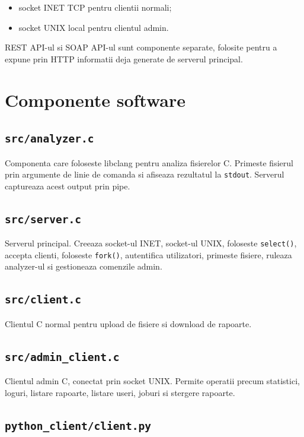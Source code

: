 \documentclass[12pt,a4paper]{article}
\begin{document}
\begin{itemize}
    \item socket INET TCP pentru clientii normali;
    \item socket UNIX local pentru clientul admin.
\end{itemize}

REST API-ul si SOAP API-ul sunt componente separate, folosite pentru a expune prin HTTP informatii deja generate de serverul principal.

\section{Componente software}

\subsection{\texttt{src/analyzer.c}}

Componenta care foloseste libclang pentru analiza fisierelor C. Primeste fisierul prin argumente de linie de comanda si afiseaza rezultatul la \texttt{stdout}. Serverul captureaza acest output prin pipe.

\subsection{\texttt{src/server.c}}

Serverul principal. Creeaza socket-ul INET, socket-ul UNIX, foloseste \texttt{select()}, accepta clienti, foloseste \texttt{fork()}, autentifica utilizatori, primeste fisiere, ruleaza analyzer-ul si gestioneaza comenzile admin.

\subsection{\texttt{src/client.c}}

Clientul C normal pentru upload de fisiere si download de rapoarte.

\subsection{\texttt{src/admin\_client.c}}

Clientul admin C, conectat prin socket UNIX. Permite operatii precum statistici, loguri, listare rapoarte, listare useri, joburi si stergere rapoarte.

\subsection{\texttt{python\_client/client.py}}
\end{document}
